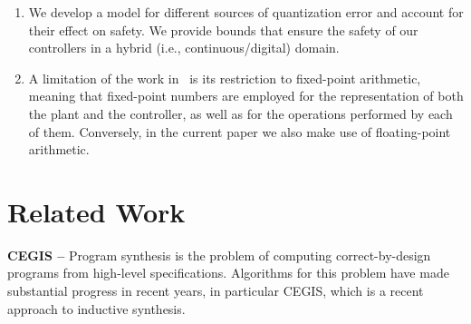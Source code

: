 \documentclass[twocolumn]{autart}    %
\renewcommand{\note}[1]{\textcolor{red}{[#1]}}
\begin{document}
\begin{enumerate}
%
\item We develop a model for different sources of quantization error and account for 
  their effect on safety.  We provide bounds that ensure the
  safety of our controllers in a hybrid (i.e., continuous/digital) domain.



\item A limitation of the work in~\cite{DBLP:conf/cav/AbateBCCDKKP17} 
  is its restriction to fixed-point arithmetic, meaning that fixed-point
  numbers are employed for the representation of both the plant and the
  controller, as well as for the operations performed by each of them. 
  Conversely, in the current paper we also make use of floating-point
  arithmetic.  
  
\end{enumerate}
  
\section{Related Work}
\label{sec:relw}

\textbf{CEGIS --} Program synthesis is the problem of computing
correct-by-design programs from high-level specifications. Algorithms
for this problem have made substantial progress in recent years, in
particular CEGIS, which is a recent approach to inductive synthesis.
\end{document}
